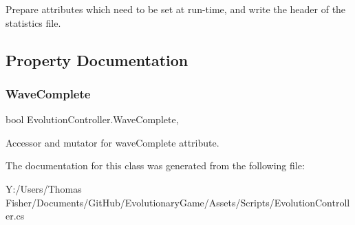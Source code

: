 Prepare attributes which need to be set at run-\/time, and write the header of the statistics file. 



\subsection{Property Documentation}
\mbox{\label{class_evolution_controller_a1649ff1641add0d5982e8eec77dc195d}} 
\subsubsection{\texorpdfstring{Wave\+Complete}{WaveComplete}}
{\footnotesize\ttfamily bool Evolution\+Controller.\+Wave\+Complete\hspace{0.3cm}{\ttfamily [get]}, {\ttfamily [set]}}



Accessor and mutator for wave\+Complete attribute. 



The documentation for this class was generated from the following file\+:\begin{DoxyCompactItemize}
\item 
Y\+:/\+Users/\+Thomas Fisher/\+Documents/\+Git\+Hub/\+Evolutionary\+Game/\+Assets/\+Scripts/Evolution\+Controller.\+cs\end{DoxyCompactItemize}
